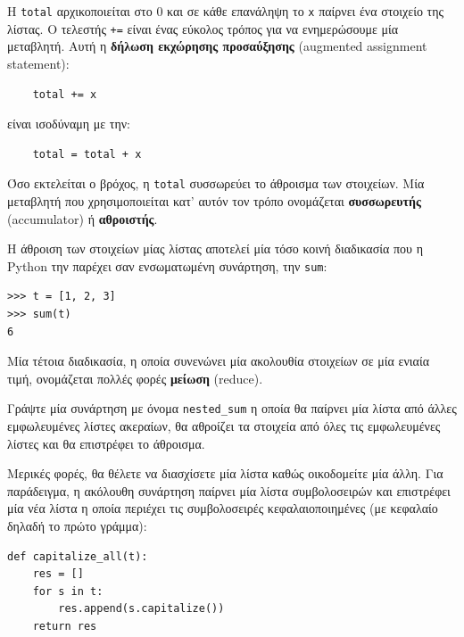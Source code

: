 \documentclass[10pt]{book}
\begin{document}
Η {\tt total} αρχικοποιείται στο 0 και σε κάθε επανάληψη το {\tt x} παίρνει ένα στοιχείο της λίστας. Ο τελεστής {\tt +=} είναι ένας εύκολος τρόπος για να ενημερώσουμε μία μεταβλητή. Αυτή η {\bf δήλωση εκχώρησης προσαύξησης} (augmented assignment statement):

\begin{verbatim}
    total += x
\end{verbatim}
%

είναι ισοδύναμη με την:

\begin{verbatim}
    total = total + x
\end{verbatim}
%

Όσο εκτελείται ο βρόχος, η {\tt total} συσσωρεύει το άθροισμα των στοιχείων.
Μία μεταβλητή που χρησιμοποιείται κατ' αυτόν τον τρόπο ονομάζεται {\bf συσσωρευτής} (accumulator) ή {\bf αθροιστής}.

Η άθροιση των στοιχείων μίας λίστας αποτελεί μία τόσο κοινή διαδικασία που η Python την παρέχει σαν ενσωματωμένη συνάρτηση, την {\tt sum}:

\begin{verbatim}
>>> t = [1, 2, 3]
>>> sum(t)
6
\end{verbatim}
%

Μία τέτοια διαδικασία, η οποία συνενώνει μία ακολουθία στοιχείων σε μία ενιαία τιμή, ονομάζεται πολλές φορές {\bf μείωση} (reduce).
\\


\begin{exercise}

Γράψτε μία συνάρτηση με όνομα \verb"nested_sum" η οποία θα παίρνει μία λίστα από άλλες εμφωλευμένες λίστες ακεραίων, θα αθροίζει τα στοιχεία από όλες τις εμφωλευμένες λίστες και θα επιστρέφει το άθροισμα.
\end{exercise}

Μερικές φορές, θα θέλετε να διασχίσετε μία λίστα καθώς οικοδομείτε μία άλλη. Για παράδειγμα, η ακόλουθη συνάρτηση παίρνει μία λίστα συμβολοσειρών και επιστρέφει μία νέα λίστα η οποία περιέχει τις συμβολοσειρές κεφαλαιοποιημένες (με κεφαλαίο δηλαδή το πρώτο γράμμα):

\begin{verbatim}
def capitalize_all(t):
    res = []
    for s in t:
        res.append(s.capitalize())
    return res
\end{verbatim}
%
\end{document}
